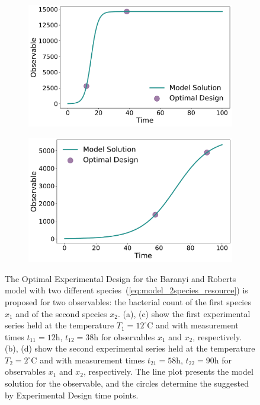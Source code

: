 \documentclass[10pt,A4paper]{article}
\begin{document}
\begin{figure}[H]
      \begin{subfigure}{.5\textwidth}
        \centering
        \includegraphics[scale=0.255]{Figures/Observable_Results_baranyi_roberts_ode_fisher_determinant_2species_rel_sensit_cont_2times_2temps_000_x_01.pdf}
    \end{subfigure}
    \begin{subfigure}{.5\textwidth}
        \centering
        \includegraphics[scale=0.255]{Figures/Observable_Results_baranyi_roberts_ode_fisher_determinant_2species_rel_sensit_cont_2times_2temps_001_x_01.pdf}
    \end{subfigure} 
    \caption{{\footnotesize
    The Optimal Experimental Design for the Baranyi and Roberts model with two different species~(\ref{eq:model_2species_resource}) is proposed for two observables: the bacterial count of the first species $x_1$ and of the second species $x_2$.
    (a), (c) show the first experimental series held at the temperature $T_1=12^\circ$C and with measurement times $t_{11}=12$h, $t_{12}=38$h for observables $x_1$ and $x_2$, respectively.
    (b), (d) show the second experimental series held at the temperature $T_2=2^\circ$C and with measurement times $t_{21}=58$h, $t_{22}=90$h for observables $x_1$ and $x_2$, respectively.
    The line plot presents the model solution for the observable, and the circles determine the suggested by Experimental Design time points.}}
    \label{fig:baranyi_roberts_2species_observable}
\end{figure}
\end{document}
